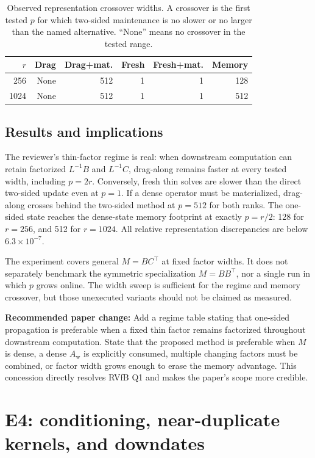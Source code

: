 \documentclass[11pt]{article}
\newcommand{\Aw}{A_{\mathrm w}}
\newcommand{\paperchange}[1]{\textbf{Recommended paper change:} #1}
\begin{document}
\begin{table}[ht]
\centering
\caption{Observed representation crossover widths.  A crossover is the first
tested \(p\) for which two-sided maintenance is no slower or no larger than
the named alternative.  ``None'' means no crossover in the tested range.}
\label{tab:e3-cross}
\begin{tabular}{@{}rrrrrr@{}}
\toprule
\(r\) & Drag & Drag+mat. & Fresh & Fresh+mat. & Memory \\
\midrule
256  & None & 512 & 1 & 1 & 128 \\
1024 & None & 512 & 1 & 1 & 512 \\
\bottomrule
\end{tabular}
\end{table}

\subsection{Results and implications}

The reviewer's thin-factor regime is real: when downstream computation can
retain factorized \(L^{-1}B\) and \(L^{-1}C\), drag-along remains faster at
every tested width, including \(p=2r\).  Conversely, fresh thin solves are
slower than the direct two-sided update even at \(p=1\).  If a dense operator
must be materialized, drag-along crosses behind the two-sided method at
\(p=512\) for both ranks.  The one-sided state reaches the dense-state memory
footprint at exactly \(p=r/2\): 128 for \(r=256\), and 512 for \(r=1024\).
All relative representation discrepancies are below
\(6.3\times10^{-7}\).

The experiment covers general \(M=BC^\top\) at fixed factor widths.  It does
not separately benchmark the symmetric specialization \(M=BB^\top\), nor a
single run in which \(p\) grows online.  The width sweep is sufficient for the
regime and memory crossover, but those unexecuted variants should not be
claimed as measured.

\paperchange{Add a regime table stating that one-sided propagation is
preferable when a fixed thin factor remains factorized throughout downstream
computation.  State that the proposed method is preferable when \(M\) is
dense, a dense \(\Aw\) is explicitly consumed, multiple changing factors must
be combined, or factor width grows enough to erase the memory advantage.
This concession directly resolves RVfB Q1 and makes the paper's scope more
credible.}

\section{E4: conditioning, near-duplicate kernels, and downdates}
\label{sec:e4}
\end{document}
